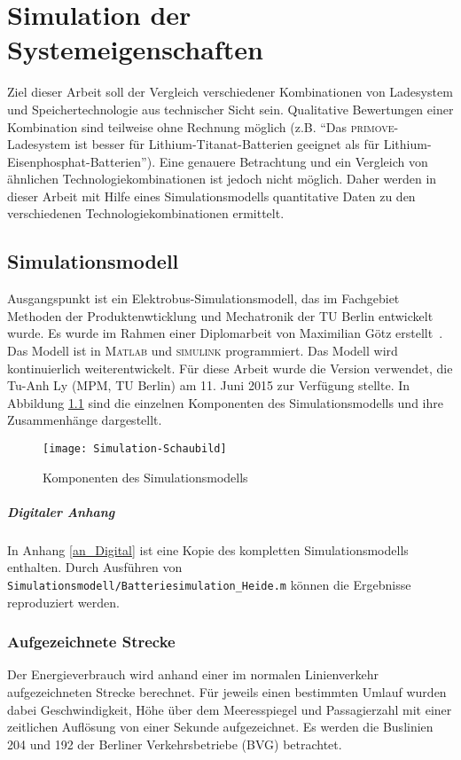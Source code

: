 \chapter{Simulation der Systemeigenschaften}
\label{chap4}
Ziel dieser Arbeit soll der Vergleich verschiedener Kombinationen von Ladesystem und Speichertechnologie aus technischer Sicht sein. Qualitative Bewertungen einer Kombination sind teilweise ohne Rechnung möglich (z.B. "`Das \textsc{primove}-Ladesystem ist besser für Lithium-Titanat-Batterien geeignet als für Lithium-Eisenphosphat-Batterien"'). Eine genauere Betrachtung und ein Vergleich von ähnlichen Technologiekombinationen ist jedoch nicht möglich. Daher werden in dieser Arbeit mit Hilfe eines Simulationsmodells quantitative Daten zu den verschiedenen Technologiekombinationen ermittelt.

\section{Simulationsmodell}
Ausgangspunkt ist ein Elektrobus-Simulationsmodell, das im Fachgebiet Methoden der Produktenwticklung und Mechatronik der TU Berlin entwickelt wurde. Es wurde im Rahmen einer Diplomarbeit von Maximilian Götz erstellt~\cite{Gotz:2013}. Das Modell ist in \textsc{Matlab} und \textsc{simulink} programmiert. Das Modell wird kontinuierlich weiterentwickelt. Für diese Arbeit wurde die Version verwendet, die Tu-Anh Ly (MPM, TU Berlin) am 11. Juni 2015 zur Verfügung stellte. In Abbildung \ref{abb_simmodell} sind die einzelnen Komponenten des Simulationsmodells und ihre Zusammenhänge dargestellt.
\begin{figure}\centering
	\texttt{[image: Simulation-Schaubild]}
	\caption{Komponenten des Simulationsmodells}
	\label{abb_simmodell}
\end{figure}

\paragraph{Digitaler Anhang} In Anhang \ref{an_Digital} ist eine Kopie des kompletten Simulationsmodells enthalten. Durch Ausführen von \texttt{Simulationsmodell/Batteriesimulation\_Heide.m} können die Ergebnisse reproduziert werden.

\subsection{Aufgezeichnete Strecke}
Der Energieverbrauch wird anhand einer im normalen Linienverkehr aufgezeichneten Strecke berechnet. Für jeweils einen bestimmten Umlauf wurden dabei Geschwindigkeit, Höhe über dem Meeresspiegel und Passagierzahl mit einer zeitlichen Auflösung von einer Sekunde aufgezeichnet. Es werden die Buslinien 204 und 192 der Berliner Verkehrsbetriebe (BVG) betrachtet.

